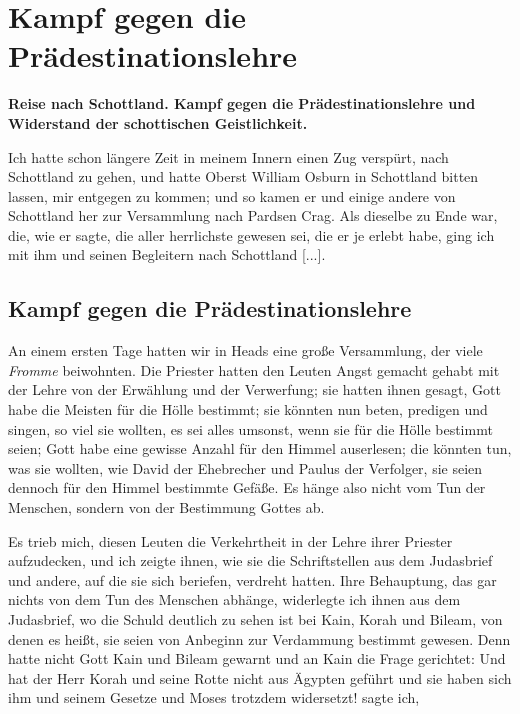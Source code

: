 
\chapter[Kampf gegen die Prädestinationslehre]{Kampf gegen die Prädestinationslehre}

\begin{center}
\textbf{Reise nach Schottland. Kampf gegen die 
Prädestinationslehre und Widerstand der schottischen 
Geistlichkeit.}
\end{center}

Ich hatte schon längere Zeit in meinem Innern einen Zug
verspürt, nach Schottland zu gehen, und hatte Oberst William
Osburn in Schottland bitten 
lassen, mir entgegen zu kommen; und
so kamen er und einige andere von Schottland 
her zur Versammlung nach Pardsen Crag. Als dieselbe zu 
Ende war, die, wie
er sagte, die aller herrlichste gewesen sei, die er je erlebt habe,
ging ich mit ihm und seinen Begleitern nach Schottland [...].

\section{Kampf gegen die Prädestinationslehre}

An einem ersten Tage hatten wir in Heads eine große 
Versammlung, der viele \textit{Fromme} beiwohnten. Die Priester hatten
den Leuten Angst gemacht gehabt mit der Lehre von der Erwählung
und der Verwerfung; sie hatten ihnen gesagt, Gott habe die Meisten
für die Hölle bestimmt; sie könnten nun beten, 
predigen und singen,
so viel sie wollten, es sei alles umsonst, wenn sie für die Hölle
bestimmt seien; Gott habe eine gewisse Anzahl für den Himmel
auserlesen; die könnten tun, was sie wollten, wie David der 
Ehebrecher und Paulus der Verfolger, sie 
seien dennoch für den
Himmel bestimmte Gefäße. Es hänge also nicht vom Tun der
Menschen, sondern von der Bestimmung Gottes 
ab. 


Es trieb
mich, diesen Leuten die Verkehrtheit in der Lehre ihrer Priester
aufzudecken, und ich zeigte ihnen, wie sie die Schriftstellen aus
dem Judasbrief und andere, auf die sie sich 
beriefen, verdreht hatten.  Ihre Behauptung, 
das gar nichts von dem Tun des
Menschen abhänge, widerlegte ich ihnen aus dem Judasbrief, wo
die Schuld deutlich zu sehen ist bei Kain, Korah und Bileam, von
denen es heißt, sie seien von Anbeginn zur Verdammung bestimmt
gewesen. Denn hatte nicht Gott Kain und Bileam gewarnt und
an Kain die Frage gerichtet:  Und hat der Herr Korah und seine
Rotte nicht aus Ägypten geführt und sie haben sich ihm und
seinem Gesetze und Moses trotzdem widersetzt! 
sagte ich, 

